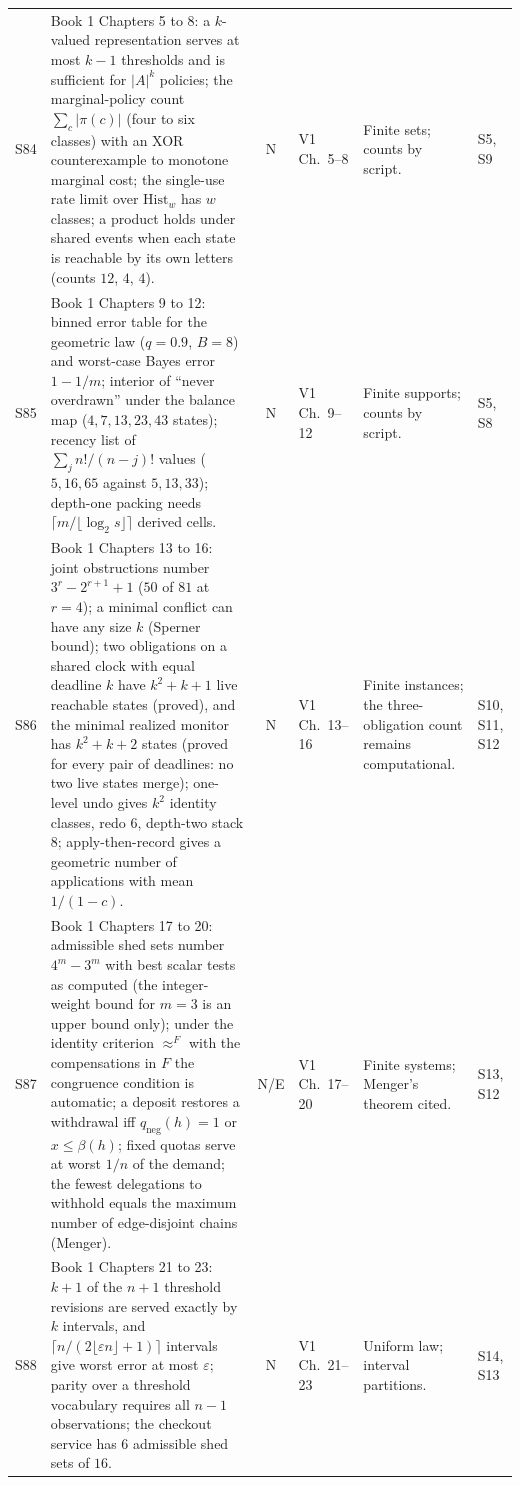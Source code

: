 \documentclass[10pt]{article}
\begin{document}
\begin{longtable}{@{}l p{} c l p{} p{}@{}}
S84 & Book 1 Chapters 5 to 8: a $k$-valued representation serves at most $k-1$ thresholds and is sufficient for $|A|^k$ policies; the marginal-policy count $\sum_c|\pi(c)|$ (four to six classes) with an XOR counterexample to monotone marginal cost; the single-use rate limit over $\mathrm{Hist}_w$ has $w$ classes; a product holds under shared events when each state is reachable by its own letters (counts $12$, $4$, $4$). & N & V1 Ch.~5--8 & Finite sets; counts by script. & S5, S9\\[3pt]
S85 & Book 1 Chapters 9 to 12: binned error table for the geometric law ($q=0.9$, $B=8$) and worst-case Bayes error $1-1/m$; interior of ``never overdrawn'' under the balance map ($4,7,13,23,43$ states); recency list of $\sum_j n!/(n-j)!$ values ($5,16,65$ against $5,13,33$); depth-one packing needs $\lceil m/\lfloor\log_2 s\rfloor\rceil$ derived cells. & N & V1 Ch.~9--12 & Finite supports; counts by script. & S5, S8\\[3pt]
S86 & Book 1 Chapters 13 to 16: joint obstructions number $3^r-2^{r+1}+1$ ($50$ of $81$ at $r=4$); a minimal conflict can have any size $k$ (Sperner bound); two obligations on a shared clock with equal deadline $k$ have $k^2+k+1$ live reachable states (proved), and the minimal realized monitor has $k^2+k+2$ states (proved for every pair of deadlines: no two live states merge); one-level undo gives $k^2$ identity classes, redo $6$, depth-two stack $8$; apply-then-record gives a geometric number of applications with mean $1/(1-c)$. & N & V1 Ch.~13--16 & Finite instances; the three-obligation count remains computational. & S10, S11, S12\\[3pt]
S87 & Book 1 Chapters 17 to 20: admissible shed sets number $4^m-3^m$ with best scalar tests as computed (the integer-weight bound for $m=3$ is an upper bound only); under the identity criterion $\approx^F$ with the compensations in $F$ the congruence condition is automatic; a deposit restores a withdrawal iff $q_{\mathrm{neg}}(h)=1$ or $x\le\beta(h)$; fixed quotas serve at worst $1/n$ of the demand; the fewest delegations to withhold equals the maximum number of edge-disjoint chains (Menger). & N/E & V1 Ch.~17--20 & Finite systems; Menger's theorem cited. & S13, S12\\[3pt]
S88 & Book 1 Chapters 21 to 23: $k+1$ of the $n+1$ threshold revisions are served exactly by $k$ intervals, and $\lceil n/(2\lfloor\varepsilon n\rfloor+1)\rceil$ intervals give worst error at most $\varepsilon$; parity over a threshold vocabulary requires all $n-1$ observations; the checkout service has $6$ admissible shed sets of $16$. & N & V1 Ch.~21--23 & Uniform law; interval partitions. & S14, S13\\[3pt]

\end{longtable}
\end{document}
